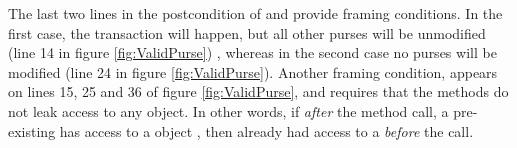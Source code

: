 The last two lines in the postcondition of  and
 provide framing conditions.  In the first case,
the transaction will happen, but all other purses will be unmodified
(line 14 in figure \ref{fig:ValidPurse}) , whereas in the second case
no purses will be modified (line 24 in figure \ref{fig:ValidPurse}).
Another framing condition, appears on lines 15, 25 and 36 of figure
\ref{fig:ValidPurse}, and requires that the methods do not leak access
to  any  object. In other
words, if \textit{after} the method call, a pre-existing  has
access to a  object , then  already had
access to a  \textit{before} the call.





